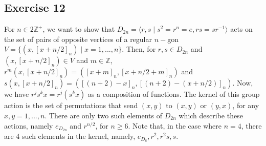 \subsection*{Exercise 12}
For $n \in 2\mathbb{Z}^+$, we want to show that $D_{2n} = \langle r,s \mid s^2 = r^n = e, rs = sr^{-1} \rangle$ acts on the set of pairs of opposite vertices of a regular $n-$gon $V = \{(x,[x + n/2]_n) \mid x = 1,..., n\}$. Then, for $r,s \in D_{2n}$ and $(x,[x+n/2]_n) \in V$ and $m \in \mathbb{Z}$, $r^m(x,[x+n/2]_n) = ([x+m]_n, [x+n/2+m]_n)$ and $s(x,[x+n/2]_n) = ([(n+2)-x]_n,[(n+2)-(x+n/2)]_n)$. Now, we have $r^js^kx = r^j(s^kx)$ as a composition of functions. The kernel of this group action is the set of permutations that send $(x,y)$ to $(x,y)$ or $(y,x)$, for any $x,y = 1,...,n$. There are only two such elements of $D_{2n}$ which describe these actions, namely $e_{D_{2n}}$ and $r^{n/2}$, for $n \ge 6$. Note that, in the case where $n = 4$, there are 4 such elements in the kernel, namely, $e_{D_8}, r^2, r^2s, s$.